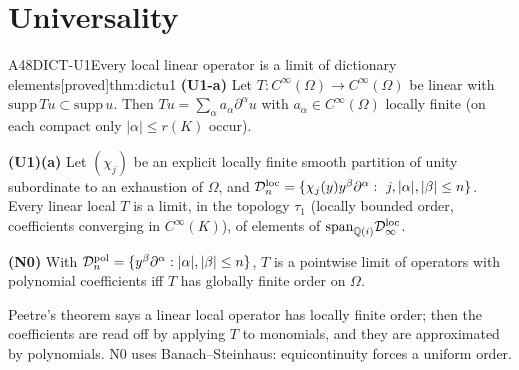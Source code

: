 \documentclass[11pt,a4paper,oneside]{report}
\newcommand{\badge}[2]{\textcolor{#1}{\textsf{\footnotesize[#2]}}}
\newcommand{\proved}{\badge{cC}{proved}}
\newenvironment{dimcard}[5]{\par\Needspace{12\baselineskip}\begin{dimcardbox}{#1}{#2}{#3}{#4}{#5}}{\end{dimcardbox}}
\begin{document}
\section{Universality}

\begin{dimcard}{A48}{DICT-U1}{Every local linear operator is a limit of dictionary elements}{\proved}{thm:dictu1}
\textbf{(U1-a)} Let $T:C^\infty(\Omega)\to C^\infty(\Omega)$ be linear with $\mathrm{supp}\,Tu\subset\mathrm{supp}\,u$. Then $Tu=\sum_\alpha a_\alpha\partial^\alpha u$ with $a_\alpha\in C^\infty(\Omega)$ locally finite (on each compact only $|\alpha|\le r(K)$ occur).

\textbf{(U1)(a)} Let $(\chi_j)$ be an explicit locally finite smooth partition of unity subordinate to an exhaustion of $\Omega$, and $\mathcal D^{\rm loc}_n=\{\chi_j(y)y^\beta\partial^\alpha:\ j,|\alpha|,|\beta|\le n\}$. Every linear local $T$ is a limit, in the topology $\tau_1$ (locally bounded order, coefficients converging in $C^\infty(K)$), of elements of $\mathrm{span}_{\mathbb Q(i)}\mathcal D^{\rm loc}_\infty$.

\textbf{(N0)} With $\mathcal D^{\rm pol}_n=\{y^\beta\partial^\alpha:|\alpha|,|\beta|\le n\}$, $T$ is a pointwise limit of operators with polynomial coefficients iff $T$ has globally finite order on $\Omega$.
\end{dimcard}

\begin{proofidea}
Peetre's theorem says a linear local operator has locally finite order; then the coefficients are read off by applying $T$ to monomials, and they are approximated by polynomials. N0 uses Banach--Steinhaus: equicontinuity forces a uniform order.
\end{proofidea}
\end{document}
